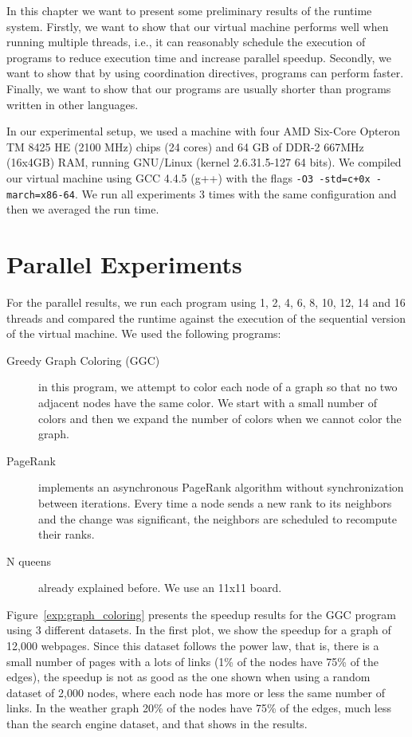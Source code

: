 In this chapter we want to present some preliminary results of the \lang runtime system.
Firstly, we want to show that our virtual machine performs well when running multiple threads,
i.e., it can reasonably schedule the execution of programs to reduce execution time and increase parallel speedup. Secondly, we want to show that by using coordination directives, programs can perform faster.
Finally, we want to show that our programs are usually shorter than programs written in other languages.  

In our experimental setup, we used a machine with
four AMD Six-Core Opteron TM 8425 HE (2100 MHz) chips (24 cores) and 64 GB of DDR-2 667MHz (16x4GB) RAM,
     running GNU/Linux (kernel 2.6.31.5-127 64 bits).
     We compiled our virtual machine using GCC 4.4.5 (g++) with the flags \texttt{-O3 -std=c+0x -march=x86-64}.
     We run all experiments 3 times with the same configuration and then we averaged the run time.

\section{Parallel Experiments}

For the parallel results, we run each program using 1, 2, 4, 6, 8, 10, 12, 14 and 16 threads and compared the runtime against the execution of the sequential version of the virtual machine. We used the following programs:

\begin{description}
   \item[Greedy Graph Coloring (GGC)] in this program, we attempt to color each node of a graph so that no two adjacent nodes have the same color. We start with a small number of colors and then we expand the number of colors when we cannot color the graph.
   \item[PageRank] implements an asynchronous PageRank algorithm without synchronization between iterations. Every time a node sends a new rank to its neighbors and the change was significant, the neighbors are scheduled to recompute their ranks.
   \item[N queens] already explained before. We use an 11x11 board.
\end{description}

Figure~\ref{exp:graph_coloring} presents the speedup results for the GGC program using 3 different datasets. In the first plot, we show the speedup for a graph of 12,000 webpages. Since this dataset follows the power law, that is, there is a small number of pages with a lots of links (1\% of the nodes have 75\% of the edges), the speedup is not as good as the one shown when using a random dataset of 2,000 nodes, where each node has more or less the same number of links. In the weather graph 20\% of the nodes have 75\% of the edges, much less than the search engine dataset, and that shows in the results.

